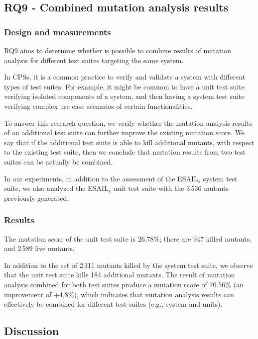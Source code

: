 \clearpage
\subsection{RQ9 - Combined mutation analysis results}
\label{sec:exp:thr}

\STARTCHANGEDWPT
\subsubsection{Design and measurements}


RQ9 aims to determine whether is possible to combine results of mutation analysis for different test suites targeting the same system.

In CPSs, it is a common practice to verify and validate a system with different types of test suites. For example, it might be common to have a unit test suite verifying isolated components of a system, and then having a system test suite verifying complex use case scenarios of certain functionalities.

To answer this research question, we verify whether the mutation analysis results of an additional test suite can further improve the existing mutation score. We say that if the additional test suite is able to kill additional mutants, with respect to the existing test suite, then we conclude that mutation results from two test suites can be actually be combined.

In our experiments, in addition to the assessment of the ESAIL$_s$ system test suite, we also analyzed the ESAIL$_s$ unit test suite with the 3\,536 mutants previously generated.

\subsubsection{Results}

The mutation score of the unit test suite is 26.78\%; there are 947 killed mutants, and 2\,589 live mutants. 

In addition to the set of 2\,311 mutants killed by the system test suite, we observe that the unit test suite kills 184 additional mutants. 
The result of mutation analysis combined for both test suites produce a mutation score of 70.56\% (an improvement of +4,8\%), which indicates that mutation analysis results can effectively be combined for different test suites (e.g., system and units).

\ENDCHANGEDWPT

\subsection{Discussion}
\label{sec:emp:discussion}

